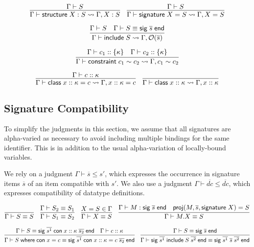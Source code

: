 \documentclass{article}
\newcommand{\mt}[1]{\mathsf{#1}}
\begin{document}
$$\infer{\Gamma \vdash \mt{structure} \; X : S \leadsto \Gamma, X : S}{
  \Gamma \vdash S
}
\quad \infer{\Gamma \vdash \mt{signature} \; X = S \leadsto \Gamma, X = S}{
  \Gamma \vdash S
}$$

$$\infer{\Gamma \vdash \mt{include} \; S \leadsto \Gamma, \mathcal O(\overline{s})}{
  \Gamma \vdash S
  & \Gamma \vdash S \equiv \mt{sig} \; \overline{s} \; \mt{end}
}$$

$$\infer{\Gamma \vdash \mt{constraint} \; c_1 \sim c_2 \leadsto \Gamma, c_1 \sim c_2}{
  \Gamma \vdash c_1 :: \{\kappa\}
  & \Gamma \vdash c_2 :: \{\kappa\}
}$$

$$\infer{\Gamma \vdash \mt{class} \; x :: \kappa = c \leadsto \Gamma, x :: \kappa = c}{
  \Gamma \vdash c :: \kappa
}
\quad \infer{\Gamma \vdash \mt{class} \; x :: \kappa \leadsto \Gamma, x :: \kappa}{}$$

\subsection{Signature Compatibility}

To simplify the judgments in this section, we assume that all signatures are alpha-varied as necessary to avoid including multiple bindings for the same identifier.  This is in addition to the usual alpha-variation of locally-bound variables.

We rely on a judgment $\Gamma \vdash \overline{s} \leq s'$, which expresses the occurrence in signature items $\overline{s}$ of an item compatible with $s'$.  We also use a judgment $\Gamma \vdash \overline{dc} \leq \overline{dc}$, which expresses compatibility of datatype definitions.

$$\infer{\Gamma \vdash S \equiv S}{}
\quad \infer{\Gamma \vdash S_1 \equiv S_2}{
  \Gamma \vdash S_2 \equiv S_1
}
\quad \infer{\Gamma \vdash X \equiv S}{
  X = S \in \Gamma
}
\quad \infer{\Gamma \vdash M.X \equiv S}{
  \Gamma \vdash M : \mt{sig} \; \overline{s} \; \mt{end}
  & \mt{proj}(M, \overline{s}, \mt{signature} \; X) = S
}$$

$$\infer{\Gamma \vdash S \; \mt{where} \; \mt{con} \; x = c \equiv \mt{sig} \; \overline{s^1} \; \mt{con} \; x :: \kappa = c \; \overline{s_2} \; \mt{end}}{
  \Gamma \vdash S \equiv \mt{sig} \; \overline{s^1} \; \mt{con} \; x :: \kappa \; \overline{s_2} \; \mt{end}
  & \Gamma \vdash c :: \kappa
}
\quad \infer{\Gamma \vdash \mt{sig} \; \overline{s^1} \; \mt{include} \; S \; \overline{s^2} \; \mt{end} \equiv \mt{sig} \; \overline{s^1} \; \overline{s} \; \overline{s^2} \; \mt{end}}{
  \Gamma \vdash S \equiv \mt{sig} \; \overline{s} \; \mt{end}
}$$
\end{document}
